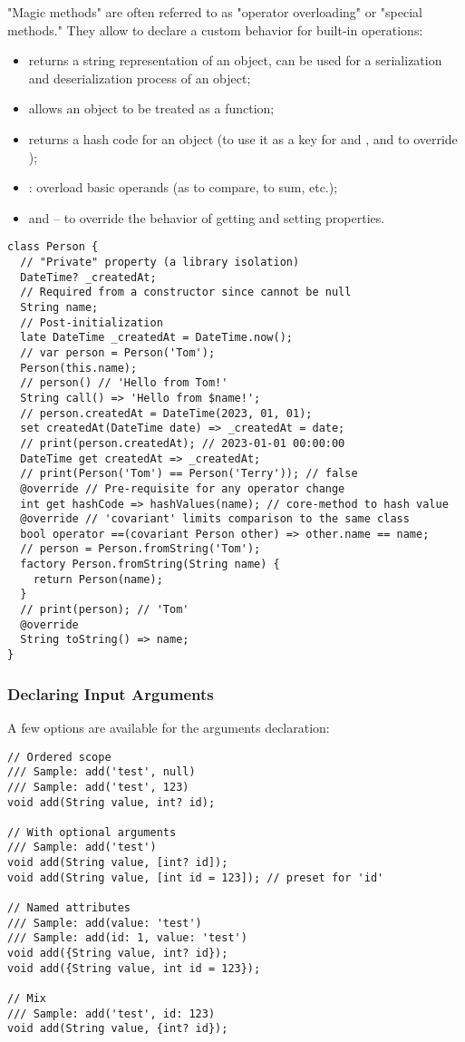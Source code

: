 "Magic methods" are often referred to as "operator overloading" or "special methods." They allow to declare a custom 
behavior for built-in operations:

\begin{itemize}
  \item {} returns a string representation of an object, can be used for a serialization and deserialization 
  process of an object;
  \item {} allows an object to be treated as a function;
  \item {} returns a hash code for an object (to use it as a key for  and , and to override \q{==});
  \item {}: overload basic operands (as \q{==} to compare, \q{+} to sum, etc.);
  \item {} and  -- to override the behavior of getting and setting properties.
\end{itemize}

\begin{lstlisting}
class Person {
  // "Private" property (a library isolation)
  DateTime? _createdAt;
  // Required from a constructor since cannot be null
  String name;
  // Post-initialization
  late DateTime _createdAt = DateTime.now();
  // var person = Person('Tom');
  Person(this.name);
  // person() // 'Hello from Tom!'
  String call() => 'Hello from $name!';
  // person.createdAt = DateTime(2023, 01, 01);
  set createdAt(DateTime date) => _createdAt = date;
  // print(person.createdAt); // 2023-01-01 00:00:00
  DateTime get createdAt => _createdAt;
  // print(Person('Tom') == Person('Terry')); // false
  @override // Pre-requisite for any operator change
  int get hashCode => hashValues(name); // core-method to hash value
  @override // 'covariant' limits comparison to the same class
  bool operator ==(covariant Person other) => other.name == name;
  // person = Person.fromString('Tom');
  factory Person.fromString(String name) {
    return Person(name);
  }
  // print(person); // 'Tom'
  @override
  String toString() => name;
}
\end{lstlisting}


\subsubsection{Declaring Input Arguments}

A few options are available for the arguments declaration:

\begin{lstlisting}
// Ordered scope
/// Sample: add('test', null) 
/// Sample: add('test', 123) 
void add(String value, int? id);

// With optional arguments
/// Sample: add('test')
void add(String value, [int? id]);
void add(String value, [int id = 123]); // preset for 'id'

// Named attributes
/// Sample: add(value: 'test')
/// Sample: add(id: 1, value: 'test')
void add({String value, int? id});
void add({String value, int id = 123});

// Mix
/// Sample: add('test', id: 123)
void add(String value, {int? id});
\end{lstlisting}

